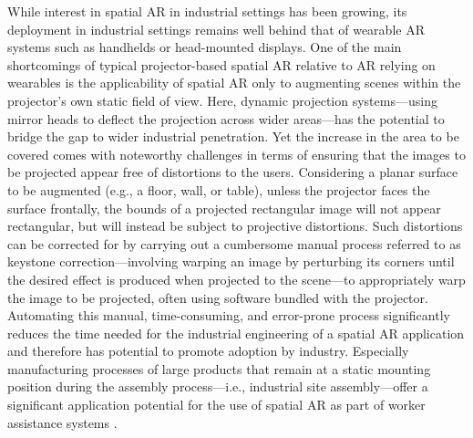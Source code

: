 \documentclass[review]{elsarticle}
\begin{document}
While interest in spatial AR in industrial settings has been growing, its deployment in industrial settings remains well behind that of wearable AR systems such as handhelds or head-mounted displays. One of the main shortcomings of typical projector-based spatial AR relative to AR relying on wearables is the applicability of spatial AR only to augmenting scenes within the projector's own static field of view. Here, dynamic projection systems---using mirror heads to deflect the projection across wider areas---has the potential to bridge the gap to wider industrial penetration. Yet the increase in the area to be covered comes with noteworthy challenges in terms of ensuring that the images to be projected appear free of distortions to the users. Considering a planar surface to be augmented (e.g., a floor, wall, or table), unless the projector faces the surface frontally, the bounds of a projected rectangular image will not appear rectangular, but will instead be subject to projective distortions. Such distortions can be corrected for by carrying out a cumbersome manual process referred to as keystone correction---involving warping an image by perturbing its corners until the desired effect is produced when projected to the scene---to appropriately warp the image to be projected, often using software bundled with the projector. Automating this manual, time-consuming, and error-prone process significantly reduces the time needed for the industrial engineering of a spatial AR application and therefore has potential to promote adoption by industry. Especially manufacturing processes of large products that remain at a static mounting position during the assembly process---i.e., industrial site assembly---offer a significant application potential for the use of spatial AR as part of worker assistance systems \cite{mayrhofer2019one}.
\end{document}
